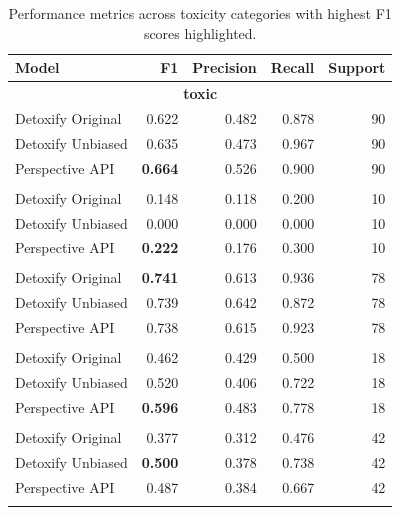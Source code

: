 \begin{table}[p]
    \centering\small
    \caption{Performance metrics across toxicity categories with highest F1 scores highlighted.}
    \label{table-performance-metrics}
    \begin{tabular}{@{}lrrrr@{}}
      \toprule
      \textbf{Model} & \textbf{F1} & \textbf{Precision} & \textbf{Recall} & \textbf{Support} \\
      \midrule
      \multicolumn{5}{c}{\bfseries toxic} \\
      Detoxify Original      & 0.622 & 0.482 & 0.878 & 90 \\
      Detoxify Unbiased      & 0.635 & 0.473 & 0.967 & 90 \\
      Perspective API        & \textbf{0.664} & 0.526 & 0.900 & 90 \\
      \addlinespace[0.5em]
      
      \multicolumn{5}{c}{\bfseries severe toxic} \\
      Detoxify Original      & 0.148 & 0.118 & 0.200 & 10 \\
      Detoxify Unbiased      & 0.000 & 0.000 & 0.000 & 10 \\
      Perspective API        & \textbf{0.222} & 0.176 & 0.300 & 10 \\
      \addlinespace[0.5em]
      
      \multicolumn{5}{c}{\bfseries obscene} \\
      Detoxify Original      & \textbf{0.741} & 0.613 & 0.936 & 78 \\
      Detoxify Unbiased      & 0.739 & 0.642 & 0.872 & 78 \\
      Perspective API        & 0.738 & 0.615 & 0.923 & 78 \\
      \addlinespace[0.5em]
      
      \multicolumn{5}{c}{\bfseries threat} \\
      Detoxify Original      & 0.462 & 0.429 & 0.500 & 18 \\
      Detoxify Unbiased      & 0.520 & 0.406 & 0.722 & 18 \\
      Perspective API        & \textbf{0.596} & 0.483 & 0.778 & 18 \\
      \addlinespace[0.5em]
      
      \multicolumn{5}{c}{\bfseries insult} \\
      Detoxify Original      & 0.377 & 0.312 & 0.476 & 42 \\
      Detoxify Unbiased      & \textbf{0.500} & 0.378 & 0.738 & 42 \\
      Perspective API        & 0.487 & 0.384 & 0.667 & 42 \\
      \addlinespace[0.5em]
      

\end{tabular}
\end{table}
